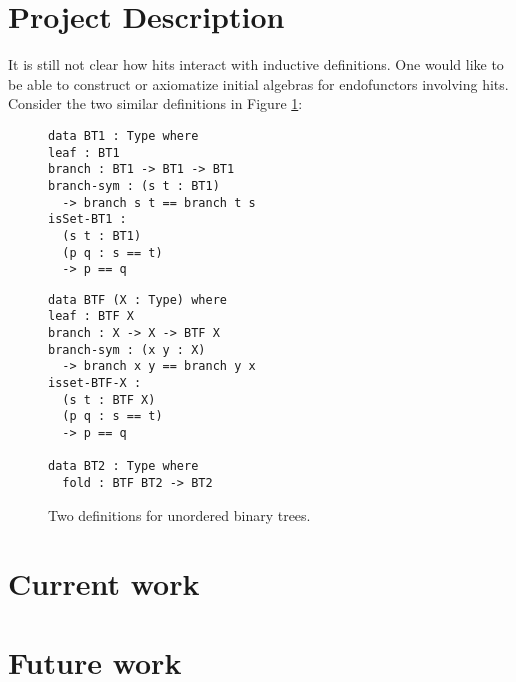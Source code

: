 \documentclass[a4paper]{article}
\begin{document}
\section{Project Description}

It is still not clear how \glspl{hit} interact with inductive definitions. One would like to be able to construct or axiomatize initial algebras for endofunctors involving \glspl{hit}. Consider the two similar definitions in Figure \ref{fig:trdefs}:

\begin{figure}
	\caption{Two definitions for unordered binary trees.}
	\label{fig:trdefs}
	\centering
	\begin{minipage}{.45\textwidth}
		\begin{lstlisting}
data BT1 : Type where
leaf : BT1
branch : BT1 -> BT1 -> BT1
branch-sym : (s t : BT1)
  -> branch s t == branch t s
isSet-BT1 :
  (s t : BT1)
  (p q : s == t)
  -> p == q
\end{lstlisting}
	\end{minipage}
	\qquad
	\begin{minipage}{.45\textwidth}
		\begin{lstlisting}
data BTF (X : Type) where
leaf : BTF X
branch : X -> X -> BTF X
branch-sym : (x y : X)
  -> branch x y == branch y x
isset-BTF-X :
  (s t : BTF X)
  (p q : s == t)
  -> p == q

data BT2 : Type where
  fold : BTF BT2 -> BT2
\end{lstlisting}
	\end{minipage}
\end{figure}



\section{Current work}


\section{Future work}



\printacronyms
\printbibliography
\end{document}
